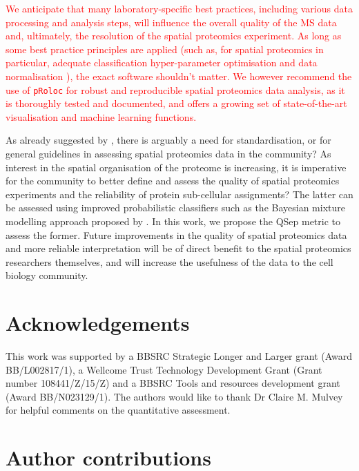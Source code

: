 \documentclass[12pt]{article}\usepackage[]{graphicx}\usepackage[]{color}
\begin{document}
\textcolor{red}{We anticipate that many laboratory-specific best
  practices, including various data processing and analysis steps,
  will influence the overall quality of the MS data and, ultimately,
  the resolution of the spatial proteomics experiment. As long as some
  best practice principles are applied (such as, for spatial
  proteomics in particular, adequate classification hyper-parameter
  optimisation and data normalisation \cite{Gatto:2014}), the exact
  software shouldn't matter. We however recommend the use of
  \texttt{pRoloc} \cite{Gatto:2014a} for robust and reproducible
  spatial proteomics data analysis, as it is thoroughly tested and
  documented, and offers a growing set of state-of-the-art
  visualisation and machine learning functions.}

\bigskip


As already suggested by \citet{Lund-Johansen:2016}, there is arguably
a need for standardisation, or for general guidelines in assessing
spatial proteomics data in the community? As interest in the spatial
organisation of the proteome is increasing, it is imperative for the
community to better define and assess the quality of spatial
proteomics experiments and the reliability of protein sub-cellular
assignments? The latter can be assessed using improved probabilistic
classifiers such as the Bayesian mixture modelling approach proposed
by \citet{Crook:2018}. In this work, we propose the QSep metric to
assess the former. Future improvements in the quality of spatial
proteomics data and more reliable interpretation will be of direct
benefit to the spatial proteomics researchers themselves, and will
increase the usefulness of the data to the cell biology community.

\clearpage

\section*{Acknowledgements}

This work was supported by a BBSRC Strategic Longer and Larger grant
(Award BB/L002817/1), a Wellcome Trust Technology Development Grant
(Grant number 108441/Z/15/Z) and a BBSRC Tools and resources
development grant (Award BB/N023129/1). The authors would like to
thank Dr Claire M. Mulvey for helpful comments on the quantitative
assessment.

\section*{Author contributions}
\end{document}
